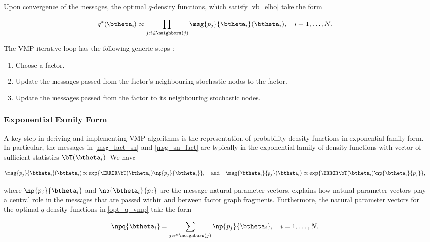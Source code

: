 \documentclass[12pt]{article}
\theoremstyle{plain}
\theoremstyle{definition}
\theoremstyle{remark}
\begin{document}
\noindent Upon convergence of the messages, the optimal $q$-density functions, which satisfy \eqref{vb_elbo}
take the form

\begin{equation}
	q^* (\btheta_i) \propto \prod_{j : i \in \neighbors(j)} \msg{p_j}{\btheta_i} (\btheta_i), \quad i = 1, \dots, N.
\label{opt_q_vmp}
\end{equation}

\noindent The VMP iterative loop has the following generic steps \cite{minka05, wand17}:

\begin{enumerate}
	\item Choose a factor.
	\item Update the messages passed from the factor's neighbouring stochastic nodes to the factor.
	\item Update the messages passed from the factor to its neighbouring stochastic nodes.
\end{enumerate}


\subsubsection{Exponential Family Form}
\label{sec:exp_fam_form}

A key step in deriving and implementing VMP algorithms is the representation of probability density functions
in exponential family form. In particular, the messages in \eqref{msg_fact_sn} and \eqref{msg_sn_fact}
are typically in the exponential family of density functions with vector of sufficient statistics $\bT (\btheta_i)$. We have

\[
	\msg{p_j}{\btheta_i} (\btheta_i)
		\propto
			\exp \{ \T{\bT (\btheta_i)} \np{p_j}{\btheta_i} \}, \quad
	\text{and} \quad
	\msg{\btheta_i}{p_j} (\btheta_i)
		\propto
			\exp \{ \T{\bT (\btheta_i)} \np{\btheta_i}{p_j} \},
\]

\noindent where $\np{p_j}{\btheta_i}$ and $\np{\btheta_i}{p_j}$ are the message natural parameter vectors.
 explains how natural parameter vectors play a central role in the messages that are
passed within and between factor graph fragments. Furthermore, the natural parameter vectors for the
optimal $q$-density functions in \eqref{opt_q_vmp} take the form

\begin{equation}
	\npq{\btheta_i} = \sum_{j : i \in \neighbors(j)} \np{p_j}{\btheta_i}, \quad i = 1, \dots, N.
\label{etaq}
\end{equation}
\end{document}
